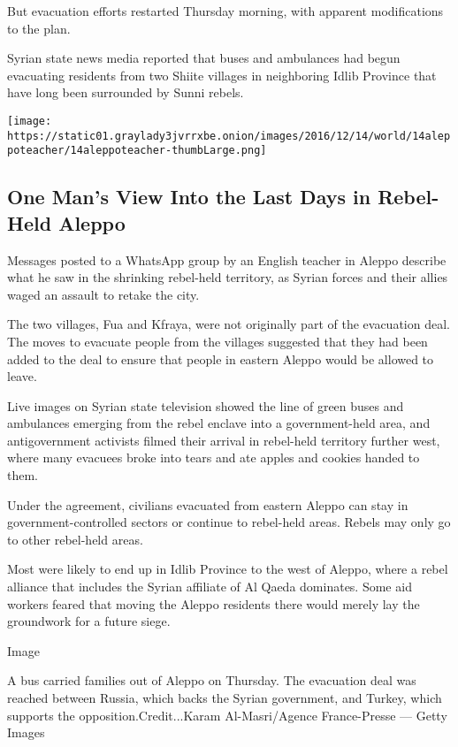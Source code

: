 But evacuation efforts restarted Thursday morning, with apparent
modifications to the plan.

Syrian state news media reported that buses and ambulances had begun
evacuating residents from two Shiite villages in neighboring Idlib
Province that have long been surrounded by Sunni rebels.

\href{https://www.nytimes3xbfgragh.onion/interactive/2016/12/14/world/middleeast/aleppo-siege-audio-video.html}{}

\texttt{[image: https://static01.graylady3jvrrxbe.onion/images/2016/12/14/world/14aleppoteacher/14aleppoteacher-thumbLarge.png]}

\hypertarget{one-mans-view-into-the-last-days-in-rebel-held-aleppo}{%
\subsection{One Man's View Into the Last Days in Rebel-Held
Aleppo}\label{one-mans-view-into-the-last-days-in-rebel-held-aleppo}}

Messages posted to a WhatsApp group by an English teacher in Aleppo
describe what he saw in the shrinking rebel-held territory, as Syrian
forces and their allies waged an assault to retake the city.

The two villages, Fua and Kfraya, were not originally part of the
evacuation deal. The moves to evacuate people from the villages
suggested that they had been added to the deal to ensure that people in
eastern Aleppo would be allowed to leave.

Live images on Syrian state television showed the line of green buses
and ambulances emerging from the rebel enclave into a government-held
area, and antigovernment activists filmed their arrival in rebel-held
territory further west, where many evacuees broke into tears and ate
apples and cookies handed to them.

Under the agreement, civilians evacuated from eastern Aleppo can stay in
government-controlled sectors or continue to rebel-held areas. Rebels
may only go to other rebel-held areas.

Most were likely to end up in Idlib Province to the west of Aleppo,
where a rebel alliance that includes the Syrian affiliate of Al Qaeda
dominates. Some aid workers feared that moving the Aleppo residents
there would merely lay the groundwork for a future siege.

Image

A bus carried families out of Aleppo on Thursday. The evacuation deal
was reached between Russia, which backs the Syrian government, and
Turkey, which supports the opposition.Credit...Karam Al-Masri/Agence
France-Presse --- Getty Images

